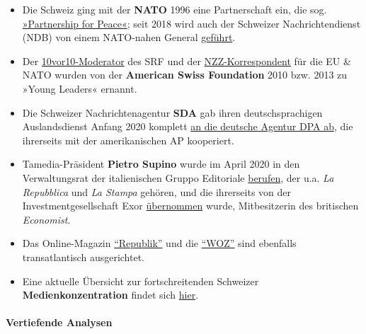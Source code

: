 \begin{itemize}
\tightlist
\item
  Die Schweiz ging mit der \textbf{NATO} 1996 eine Partnerschaft ein,
  die sog. \href{http://www.pfp.admin.ch/}{»Partnership for Peace«};
  seit 2018 wird auch der Schweizer Nachrichtendienst (NDB) von einem
  NATO-nahen General
  \href{https://www.admin.ch/gov/de/start/dokumentation/medienmitteilungen.msg-id-70400.html}{geführt}.
\item
  Der
  \href{http://www.americanswiss.org/news/arthur-honegger-spotlight/}{10vor10-​Mode­ra­tor}
  des SRF und der
  \href{http://www.americanswiss.org/news/niklaus-nuspliger-spotlight/}{NZZ-Korres­pon­dent}
  für die EU \& NATO wurden von der \textbf{Ameri­can Swiss
  Foun­da­tion} 2010 bzw. 2013 zu »Young Leaders« ernannt.
\item
  Die Schweizer Nachrichtenagentur \textbf{SDA} gab ihren
  deutschsprachigen Auslandsdienst Anfang 2020 komplett
  \href{http://www.kleinreport.ch/news/keystone-sda-streicht-eigenen-auslanddienst-93855/}{an
  die deutsche Agentur DPA ab}, die ihrerseits mit der amerikanischen AP
  kooperiert.
\item
  Tamedia-Präsident \textbf{Pietro Supino} wurde im April 2020 in den
  Verwaltungsrat der italienischen Gruppo Editoriale
  \href{https://www.persoenlich.com/medien/pietro-supino-wird-verwaltungsrat}{berufen},
  der u.a. \emph{La Repubblica} und \emph{La Stampa} gehören, und die
  ihrerseits von der Investmentgesellschaft Exor
  \href{https://www.infosperber.ch/Artikel/Medien/La-Stampa-Russland-Atlantic-Council-Pietro-Supino}{übernommen}
  wurde, Mitbesitzerin des britischen \emph{Economist}.
\item
  Das Online-Magazin
  \href{https://swprs.org/die-republik-und-das-imperium/}{``Republik''}
  und die \href{https://swprs.org/die-woz-und-die-weltpolitik/}{``WOZ''}
  sind ebenfalls transatlantisch ausgerichtet.
\item
  Eine aktuelle Übersicht zur fortschreitenden Schweizer
  \textbf{Medienkonzentration} findet sich
  \href{https://www.republik.ch/2018/05/17/chronologie-der-schweizer-medienkonzentration}{hier}.
\end{itemize}

\hypertarget{vertiefende-analysen}{%
\paragraph{Vertiefende Analysen}\label{vertiefende-analysen}}

